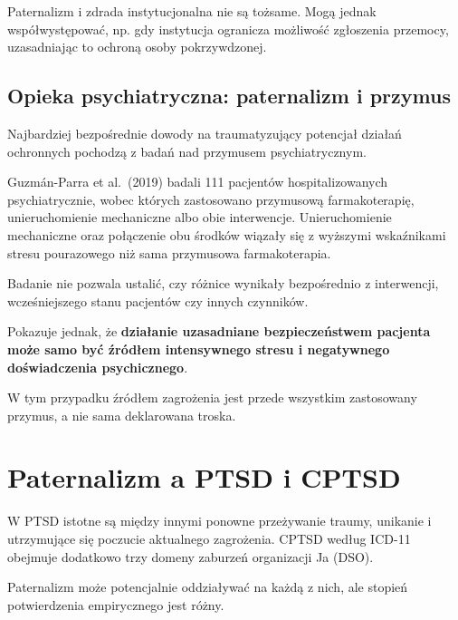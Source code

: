 \documentclass[11pt,a4paper,oneside,headinclude=true,footinclude=false]{scrartcl}
\begin{document}
Paternalizm i zdrada instytucjonalna nie są tożsame. Mogą jednak
współwystępować, np. gdy instytucja ogranicza możliwość zgłoszenia
przemocy, uzasadniając to ochroną osoby pokrzywdzonej.

\subsection{Opieka psychiatryczna: paternalizm i przymus}\label{subsec:4.5}

Najbardziej bezpośrednie dowody na traumatyzujący potencjał działań
ochronnych pochodzą z badań nad przymusem psychiatrycznym.

Guzmán-Parra et al.~(2019) badali 111 pacjentów hospitalizowanych
psychiatrycznie, wobec których zastosowano przymusową farmakoterapię,
unieruchomienie mechaniczne albo obie interwencje. Unieruchomienie
mechaniczne oraz połączenie obu środków wiązały się z wyższymi
wskaźnikami stresu pourazowego niż sama przymusowa farmakoterapia.

Badanie nie pozwala ustalić, czy różnice wynikały bezpośrednio z
interwencji, wcześniejszego stanu pacjentów czy innych czynników.

Pokazuje jednak, że \textbf{działanie uzasadniane bezpieczeństwem
pacjenta może samo być źródłem intensywnego stresu i negatywnego
doświadczenia psychicznego}.

W tym przypadku źródłem zagrożenia jest przede wszystkim zastosowany
przymus, a nie sama deklarowana troska.

\section{Paternalizm a PTSD i CPTSD}\label{sec:5}

W PTSD istotne są między innymi ponowne przeżywanie traumy, unikanie i
utrzymujące się poczucie aktualnego zagrożenia. CPTSD według ICD-11
obejmuje dodatkowo trzy domeny zaburzeń organizacji Ja (DSO).

Paternalizm może potencjalnie oddziaływać na każdą z nich, ale stopień
potwierdzenia empirycznego jest różny.
\end{document}
